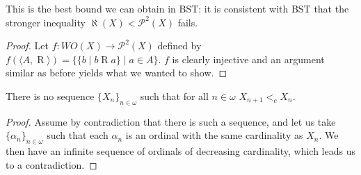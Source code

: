 This is the best bound we can obtain in BST: it is consistent with BST that the stronger inequality $\aleph(X)<\mathcal{P}^2(X)$ fails. 

\begin{proof}
	
	Let $f:WO(X)\rightarrow \mathcal{P}^2(X)$ defined by $f(\langle A,\mathrel{R}\rangle) = \{\{b\mid b \mathrel{R} a\} \mid a\in A\}$. $f$ is clearly injective and an argument similar as before yields what we wanted to show.
\end{proof}

\begin{theorem}[ZFC]
	There is no sequence $\{X_n\}_{n\in\omega}$ such that for all $n\in\omega$ $X_{n+1} <_c X_n$.
\end{theorem}
\begin{proof}
	Assume by contradiction that there is such a sequence, and let us take $\{\alpha_n\}_{n\in\omega}$ such that each $\alpha_n$ is an ordinal with the same cardinality as $X_n$. We then have an infinite sequence of ordinals of decreasing cardinality, which leads us to a contradiction.
\end{proof}


